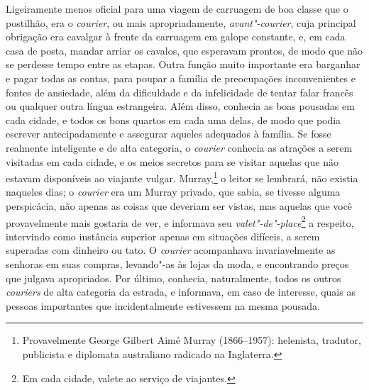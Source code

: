 Ligeiramente menos oficial para uma viagem de carruagem de boa
classe que o postilhão, era o \textit{courier}, ou mais apropriadamente,
\textit{avant"-courier}, cuja principal obrigação era cavalgar à frente da
carruagem em galope constante, e, em cada casa de posta, mandar arriar
os cavalos, que esperavam prontos, de modo que não se perdesse tempo
entre as etapas. Outra função muito importante era barganhar e pagar
todas as contas, para poupar a família de preocupações inconvenientes e
fontes de ansiedade, além da dificuldade e da infelicidade de tentar
falar francês ou qualquer outra língua estrangeira. Além disso, conhecia
as boas pousadas em cada cidade, e todos os bons quartos em cada uma
delas, de modo que podia escrever antecipadamente e assegurar aqueles
adequados à família. Se fosse realmente inteligente e de alta categoria,
o \textit{courier} conhecia as atrações a serem visitadas em cada cidade,
e os meios secretos para se visitar aquelas que não estavam disponíveis
ao viajante vulgar. Murray,\footnote{Provavelmente George Gilbert Aimé
  Murray (1866--1957): helenista, tradutor, publicista e diplomata
  australiano radicado na Inglaterra.} o leitor se
lembrará, não existia naqueles dias; o \textit{courier} era um Murray
privado, que sabia, se tivesse alguma perspicácia, não apenas as coisas
que deveriam ser vistas, mas aquelas que você provavelmente mais
gostaria de ver, e informava seu \textit{valet"-de"-place}\footnote{Em cada
  cidade, valete ao serviço de viajantes.} a respeito,
intervindo como instância superior apenas em situações difíceis, a serem
superadas com dinheiro ou tato. O \textit{courier} acompanhava
invariavelmente as senhoras em suas compras, levando"-as às lojas da
moda, e encontrando preços que julgava apropriados. Por último,
conhecia, naturalmente, todos os outros \textit{couriers} de alta
categoria da estrada, e informava, em caso de interesse, quais as
pessoas importantes que incidentalmente estivessem na mesma pousada.

